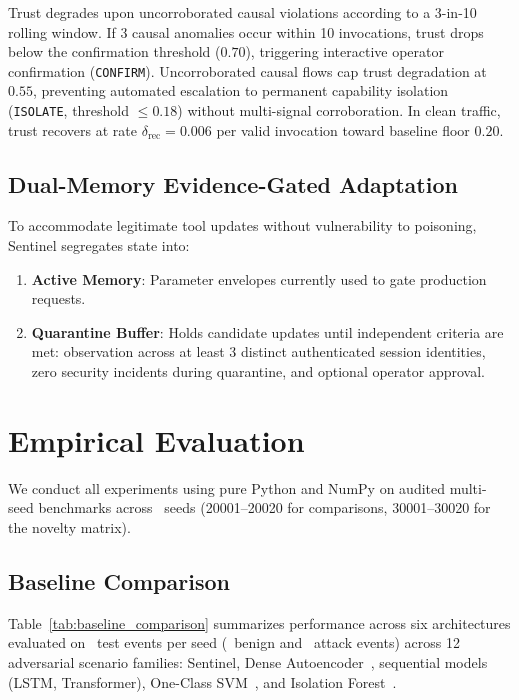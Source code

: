 \documentclass{llncs}
\begin{document}
Trust degrades upon uncorroborated causal violations according to a 3-in-10 rolling window. If 3 causal anomalies occur within 10 invocations, trust drops below the confirmation threshold ($0.70$), triggering interactive operator confirmation (\texttt{CONFIRM}). Uncorroborated causal flows cap trust degradation at $0.55$, preventing automated escalation to permanent capability isolation (\texttt{ISOLATE}, threshold $\le 0.18$) without multi-signal corroboration. In clean traffic, trust recovers at rate $\delta_{\text{rec}} = 0.006$ per valid invocation toward baseline floor $0.20$.

\subsection{Dual-Memory Evidence-Gated Adaptation}
To accommodate legitimate tool updates without vulnerability to poisoning, Sentinel segregates state into:
\begin{enumerate}
    \item \textbf{Active Memory}: Parameter envelopes currently used to gate production requests.
    \item \textbf{Quarantine Buffer}: Holds candidate updates until independent criteria are met: observation across at least 3 distinct authenticated session identities, zero security incidents during quarantine, and optional operator approval.
\end{enumerate}

\section{Empirical Evaluation}
\label{sec:evaluation}
We conduct all experiments using pure Python and NumPy on audited multi-seed benchmarks across \NoveltySeedsCount\ seeds (20001--20020 for comparisons, 30001--30020 for the novelty matrix).

\subsection{Baseline Comparison}
Table~\ref{tab:baseline_comparison} summarizes performance across six architectures evaluated on \TestEventsPerSeed\ test events per seed (\BenignTestEventsPerSeed\ benign and \AttackTestEventsPerSeed\ attack events) across 12 adversarial scenario families: Sentinel, Dense Autoencoder~\cite{goodfellow2016deep}, sequential models (LSTM, Transformer), One-Class SVM~\cite{scholkopf2001estimating}, and Isolation Forest~\cite{liu2008isolation}.
\end{document}
